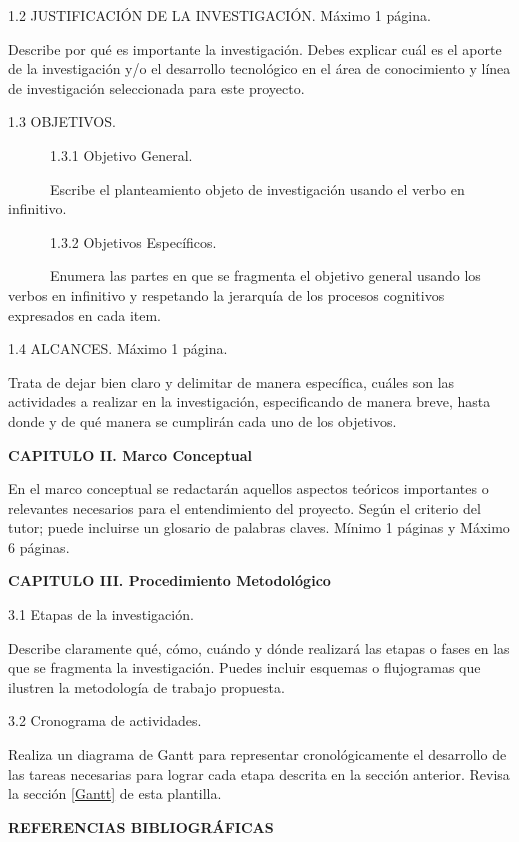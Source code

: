 1.2 JUSTIFICACIÓN DE LA INVESTIGACIÓN. Máximo 1 página. 

Describe por qué es importante la investigaci\'{o}n. Debes explicar cuál es el aporte de la investigaci\'{o}n y/o el desarrollo tecnol\'{o}gico en el \'{a}rea de conocimiento y l\'{i}nea de investigaci\'{o}n seleccionada para este proyecto.

1.3 OBJETIVOS. 

\ \ \ \ \ \ 1.3.1 Objetivo General.

\ \ \ \ \ \ Escribe el planteamiento objeto de investigaci\'{o}n usando el verbo en infinitivo.

\ \ \ \ \ \ 1.3.2 Objetivos Específicos.

\ \ \ \ \ \ Enumera las partes en que se fragmenta el objetivo general usando los verbos en infinitivo y respetando la jerarquía de los procesos cognitivos expresados en cada item.

\newpage 

1.4 ALCANCES. Máximo 1 página.

Trata de dejar bien claro y delimitar de manera espec\'{i}fica, cu\'{a}les son las actividades a realizar en la investigaci\'{o}n, especificando de manera breve, hasta donde y de qu\'{e} manera se cumplir\'{a}n cada uno de los objetivos.

\noindent\textbf{CAPITULO II. Marco Conceptual}

En el marco conceptual se redactar\'{a}n aquellos aspectos te\'{o}ricos importantes o relevantes necesarios para el entendimiento del proyecto. Seg\'{u}n el criterio del tutor; puede incluirse un glosario de palabras claves. M\'{i}nimo 1 p\'{a}ginas y Máximo 6 páginas. 


\noindent\textbf{CAPITULO III. Procedimiento Metodológico}

3.1 Etapas de la investigación.

Describe claramente  qué, cómo, cuándo y dónde realizará las etapas o fases en las que se fragmenta la investigación. Puedes incluir esquemas o flujogramas que ilustren la metodología de trabajo propuesta.

3.2 Cronograma de actividades.

Realiza un diagrama de Gantt para representar cronológicamente el desarrollo de las tareas necesarias para lograr cada etapa descrita en la sección anterior. Revisa la sección \ref{Gantt} de esta plantilla.

\noindent\textbf{REFERENCIAS BIBLIOGRÁFICAS}

\bigskip

